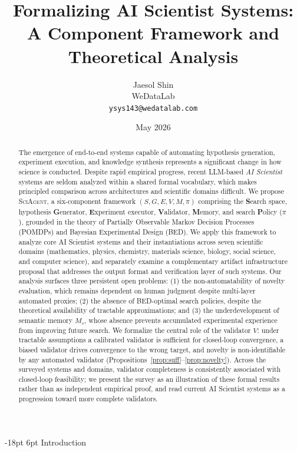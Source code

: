 \documentclass[11pt]{article}
\title{\textbf{Formalizing AI Scientist Systems:\\
A Component Framework and Theoretical Analysis}}
\author{
  Jaesol Shin\\
  \small{WeDataLab}\\
  \texttt{ysys143@wedatalab.com}
}
\date{May 2026}
\makeatletter
\renewcommand\section{\@startsection{section}{1}{\z@}%
  {-18pt \@plus -4pt \@minus -2pt}%
  {6pt \@plus 2pt}%
  {\normalfont\large\bfseries}}
\newcommand{\sgmvpi}{$(S, G, E, V, M, \pi)$}
\newcommand{\framework}{\textsc{SciAgent}}
\makeatother
\begin{document}
\maketitle

\begin{abstract}
The emergence of end-to-end systems capable of automating hypothesis generation, experiment execution, and knowledge synthesis represents a significant change in how science is conducted. Despite rapid empirical progress, recent LLM-based \emph{AI Scientist} systems are seldom analyzed within a shared formal vocabulary, which makes principled comparison across architectures and scientific domains difficult. We propose \framework{}, a six-component framework \sgmvpi{} comprising the \textbf{S}earch space, hypothesis \textbf{G}enerator, \textbf{E}xperiment executor, \textbf{V}alidator, \textbf{M}emory, and search \textbf{P}olicy ($\pi$), grounded in the theory of Partially Observable Markov Decision Processes (POMDPs) and Bayesian Experimental Design (BED). We apply this framework to analyze core AI Scientist systems and their instantiations across seven scientific domains (mathematics, physics, chemistry, materials science, biology, social science, and computer science), and separately examine a complementary artifact infrastructure proposal that addresses the output format and verification layer of such systems. Our analysis surfaces three persistent open problems: (1) the non-automatability of novelty evaluation, which remains dependent on human judgment despite multi-layer automated proxies; (2) the absence of BED-optimal search policies, despite the theoretical availability of tractable approximations; and (3) the underdevelopment of semantic memory $M_s$, whose absence prevents accumulated experimental experience from improving future search. We formalize the central role of the validator $V$: under tractable assumptions a calibrated validator is sufficient for closed-loop convergence, a biased validator drives convergence to the wrong target, and novelty is non-identifiable by any automated validator (Propositions~\ref{prop:suff}--\ref{prop:novelty}). Across the surveyed systems and domains, validator completeness is consistently associated with closed-loop feasibility; we present the survey as an illustration of these formal results rather than as independent empirical proof, and read current AI Scientist systems as a progression toward more complete validators.
\end{abstract}

\section{Introduction}
\end{document}
